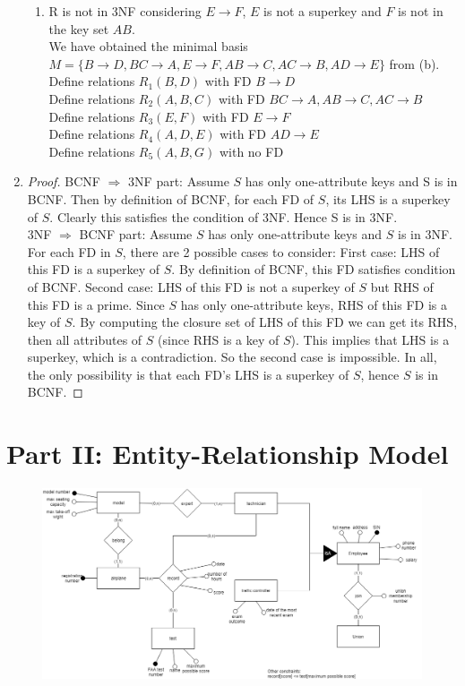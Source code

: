 \documentclass[letter, 9pt]{article}
\begin{document}
\begin{enumerate}
\begin{enumerate}
\item R is not in 3NF considering $E\rightarrow F$, $E$ is not a superkey and $F$ is not in the key set $AB$. \\
We have obtained the minimal basis $M=\{B\rightarrow D, BC\rightarrow A, E\rightarrow F, AB\rightarrow C, AC\rightarrow B, AD\rightarrow E\}$ from (b). \\
Define relations $R_1(B,D)$ with FD $B\rightarrow D$ \\
Define relations $R_2(A,B,C)$ with FD $BC\rightarrow A,AB\rightarrow C, AC\rightarrow B$ \\
Define relations $R_3(E,F)$ with FD $E\rightarrow F$ \\
Define relations $R_4(A, D, E)$ with FD $AD\rightarrow E$ \\
Define relations $R_5(A, B, G)$ with no FD 
\end{enumerate}

\item \begin{proof}
BCNF $\Rightarrow$ 3NF part: Assume $S$ has only one-attribute keys and S is in BCNF. Then by definition of BCNF, for each FD of $S$, its LHS is a superkey of $S$. Clearly this satisfies the condition of 3NF. Hence S is in 3NF.\\
3NF $\Rightarrow$ BCNF part: Assume $S$ has only one-attribute keys and $S$ is in 3NF. For each FD in $S$, there are 2 possible cases to consider: First case: LHS of this FD is a superkey of $S$. By definition of BCNF, this FD satisfies condition of BCNF. Second case: LHS of this FD is not a superkey of $S$ but RHS of this FD is a prime. Since $S$ has only one-attribute keys, RHS of this FD is a key of $S$. By computing the closure set of LHS of this FD we can get its RHS, then all attributes of $S$ (since RHS is a key of $S$). This implies that LHS is a superkey, which is a contradiction. So the second case is impossible. In all, the only possibility is that each FD's LHS is a superkey of $S$, hence $S$ is in BCNF.
\end{proof}
\end{enumerate}

\section*{Part II: Entity-Relationship Model }
\begin{enumerate}

\begin{figure}
\includegraphics[scale=0.5]{3432.png}
\end{figure}
\end{enumerate}
\end{document}
